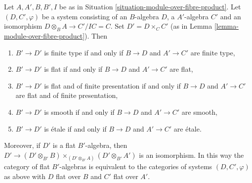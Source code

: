 \begin{lemma}
\label{lemma-properties-algebras-over-fibre-product}
Let $A, A', B, B', I$ be as in
Situation \ref{situation-module-over-fibre-product}.
Let $(D, C', \varphi)$ be a system consisting of an $B$-algebra $D$,
a $A'$-algebra $C'$ and an isomorphism $D \otimes_B A \to C'/IC = C$.
Set $D' = D \times_C C'$ (as in
Lemma \ref{lemma-module-over-fibre-product}). Then
\begin{enumerate}
\item $B' \to D'$ is finite type if and only if $B \to D$ and
$A' \to C'$ are finite type,
\item $B' \to D'$ is flat if and only if $B \to D$ and $A' \to C'$ are flat,
\item $B' \to D'$ is flat and of finite presentation if and only if
$B \to D$ and $A' \to C'$ are flat and of finite presentation,
\item $B' \to D'$ is smooth if and only if $B \to D$ and $A' \to C'$ are smooth,
\item $B' \to D'$ is \'etale if and only if $B \to D$ and $A' \to C'$
are \'etale.
\end{enumerate}
Moreover, if $D'$ is a flat $B'$-algebra, then
$D' \to (D' \otimes_{B'} B) \times_{(D' \otimes_{B'} A)} (D' \otimes_{B'} A')$
is an isomorphism. In this way the category of flat $B'$-algebras
is equivalent to the categories of systems $(D, C', \varphi)$ as above
with $D$ flat over $B$ and $C'$ flat over $A'$.
\end{lemma}

